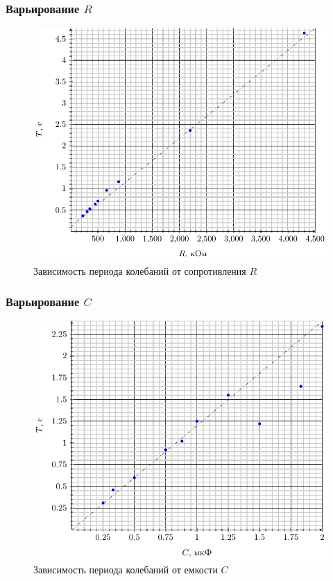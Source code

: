 \subsubsection{Варьирование $R$}

\begin{figure}[H]
	\centering
	\includegraphics[width=\textwidth]{T_R}
	\caption{Зависимость периода колебаний от сопротивления $R$}
	\label{fig:figure1}
\end{figure}
\subsubsection{Варьирование $C$}

\begin{figure}[H]
	\centering
	\includegraphics[width=\textwidth]{T_C}
	\caption{Зависимость периода колебаний от емкости $C$}
	\label{fig:figure1}
\end{figure}
